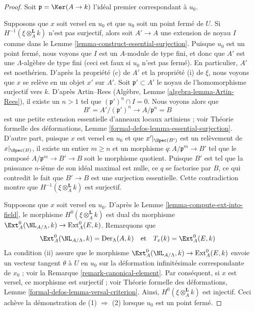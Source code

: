 \begin{proof}
Soit $\mathfrak p = \Ker(A \to k)$ l'idéal premier correspondant à $u_0$.

\medskip\noindent
Supposons que $x$ soit versel en $u_0$ et que $u_0$ soit un point fermé de $U$.
Si $H^{-1}(\xi \otimes_A^{\mathbf{L}} k)$ n'est pas surjectif, alors
soit $A' \to A$ une extension de noyau $I$ comme dans le
Lemme \ref{lemma-construct-essential-surjection}.
Puisque $u_0$ est un point fermé, nous voyons que $I$ est un $A$-module de type fini,
et donc que $A'$ est une $\Lambda$-algèbre de type fini (ceci est faux si
$u_0$ n'est pas fermé). En particulier, $A'$ est noethérien.
D'après la propriété (c) de $A'$ et la propriété (i) de $\xi$, nous voyons que $x$ se relève en
un objet $x'$ sur $A'$.
Soit $\mathfrak p' \subset A'$ le noyau de l'homomorphisme surjectif vers $k$.
D'après Artin--Rees (Algèbre, Lemme \ref{algebra-lemma-Artin-Rees}),
il existe un $n > 1$ tel que $(\mathfrak p')^n \cap I = 0$.
Nous voyons alors que
$$
B' = A'/(\mathfrak p')^n \longrightarrow A/\mathfrak p^n = B
$$
est une petite extension essentielle d'anneaux locaux artiniens ; voir
Théorie formelle des déformations, Lemme
\ref{formal-defos-lemma-essential-surjection}.
D'autre part, puisque $x$ est versel en $u_0$ et que $x'|_{\Spec(B')}$
est un relèvement de $x|_{\Spec(B)}$, il existe un entier
$m \geq n$ et un morphisme $q : A/\mathfrak p^m \to B'$
tel que le composé
$A/\mathfrak p^m \to B' \to B$ soit le morphisme quotient.
Puisque $B'$ est tel que la puissance $n$-ième de son idéal maximal est nulle, ce
$q$ se factorise par $B$, ce qui contredit le fait que $B' \to B$ est une
surjection essentielle. Cette contradiction montre que
$H^{-1}(\xi \otimes_A^{\mathbf{L}} k)$
est surjectif.

\medskip\noindent
Supposons que $x$ soit versel en $u_0$. D'après le Lemme \ref{lemma-compute-ext-into-field},
le morphisme $H^0(\xi \otimes_A^{\mathbf{L}} k)$ est dual du morphisme
$\Ext^0_A(\NL_{A/\Lambda}, k) \to \text{Ext}^0_A(E, k)$. Remarquons que
$$
\Ext^0_A(\NL_{A/\Lambda}, k) = \text{Der}_\Lambda(A, k)
\quad\text{et}\quad
T_x(k) = \Ext^0_A(E, k)
$$
La condition (ii) assure que le morphisme
$\Ext^0_A(\NL_{A/\Lambda}, k) \to \text{Ext}^0_A(E, k)$
envoie un vecteur tangent $\theta$ à $U$ en $u_0$ sur la déformation
infinitésimale correspondante de $x_0$ ; voir la Remarque \ref{remark-canonical-element}.
Par conséquent, si $x$ est versel, ce morphisme est surjectif ; voir
Théorie formelle des déformations, Lemme \ref{formal-defos-lemma-versal-criterion}.
Ainsi, $H^0(\xi \otimes_A^{\mathbf{L}} k)$ est injectif.
Ceci achève la démonstration de (1) $\Rightarrow$ (2) lorsque $u_0$ est un
point fermé.


\end{proof}
